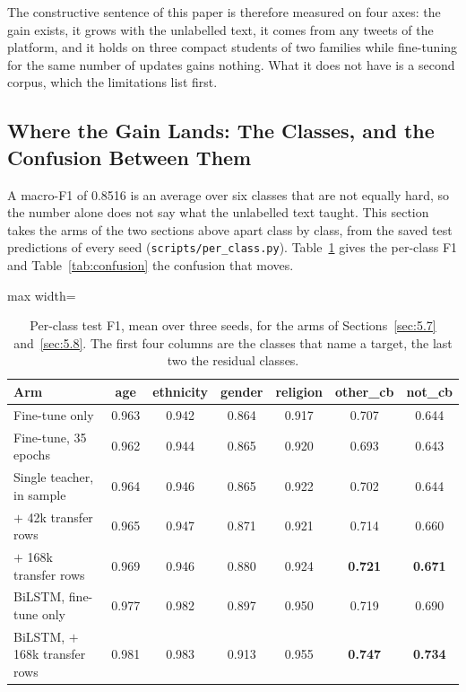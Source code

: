The constructive sentence of this paper is therefore measured on four axes: the gain exists, it
grows with the unlabelled text, it comes from any tweets of the platform, and it holds on three
compact students of two families while fine-tuning for the same number of updates gains nothing.
What it does not have is a second corpus, which the limitations list first.

\subsection{Where the Gain Lands: The Classes, and the Confusion Between Them}
\label{sec:5.9}
A macro-F1 of 0.8516 is an average over six classes that are not equally hard, so the number alone
does not say what the unlabelled text taught. This section takes the arms of the two sections above
apart class by class, from the saved test predictions of every seed
(\texttt{scripts/per\_class.py}). Table~\ref{tab:per-class} gives the per-class F1 and
Table~\ref{tab:confusion} the confusion that moves.

\begin{table}[htbp]
\centering
\small
\caption[Per-class test F1 across the arms]{Per-class test F1, mean over three seeds, for the arms of
Sections~\ref{sec:5.7} and~\ref{sec:5.8}. The first four columns are the classes that name a target,
the last two the residual classes.}
\label{tab:per-class}
\begin{adjustbox}{max width=\textwidth}
\begin{tabular}{lcccccc}
\toprule
Arm & age & ethnicity & gender & religion & other\_cb & not\_cb \\
\midrule
Fine-tune only & 0.963 & 0.942 & 0.864 & 0.917 & 0.707 & 0.644 \\
Fine-tune, 35 epochs & 0.962 & 0.944 & 0.865 & 0.920 & 0.693 & 0.643 \\
Single teacher, in sample & 0.964 & 0.946 & 0.865 & 0.922 & 0.702 & 0.644 \\
$+$ 42k transfer rows & 0.965 & 0.947 & 0.871 & 0.921 & 0.714 & 0.660 \\
$+$ 168k transfer rows & 0.969 & 0.946 & 0.880 & 0.924 & \textbf{0.721} & \textbf{0.671} \\
\midrule
BiLSTM, fine-tune only & 0.977 & 0.982 & 0.897 & 0.950 & 0.719 & 0.690 \\
BiLSTM, $+$ 168k transfer rows & 0.981 & 0.983 & 0.913 & 0.955 & \textbf{0.747} & \textbf{0.734} \\
\bottomrule
\end{tabular}
\end{adjustbox}
\end{table}

